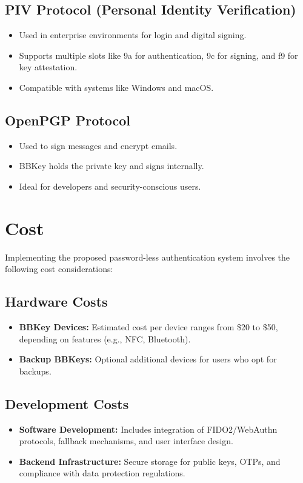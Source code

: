 \documentclass{article}[12pt]
\begin{document}
\subsection*{PIV Protocol (Personal Identity Verification)}
\begin{itemize}
    \item Used in enterprise environments for login and digital signing.
    \item Supports multiple slots like 9a for authentication, 9c for signing, and f9 for key attestation.
    \item Compatible with systems like Windows and macOS.
\end{itemize}

\subsection*{OpenPGP Protocol}
\begin{itemize}
    \item Used to sign messages and encrypt emails.
    \item BBKey holds the private key and signs internally.
    \item Ideal for developers and security-conscious users.
\end{itemize}


\section*{Cost}
Implementing the proposed password-less authentication system involves the following cost considerations:

\subsection*{Hardware Costs}
\begin{itemize}
    \item \textbf{BBKey Devices:} Estimated cost per device ranges from \$20 to \$50, depending on features (e.g., NFC, Bluetooth).
    \item \textbf{Backup BBKeys:} Optional additional devices for users who opt for backups.
\end{itemize}

\subsection*{Development Costs}
\begin{itemize}
    \item \textbf{Software Development:} Includes integration of FIDO2/WebAuthn protocols, fallback mechanisms, and user interface design.
    \item \textbf{Backend Infrastructure:} Secure storage for public keys, OTPs, and compliance with data protection regulations.
\end{itemize}
\end{document}
